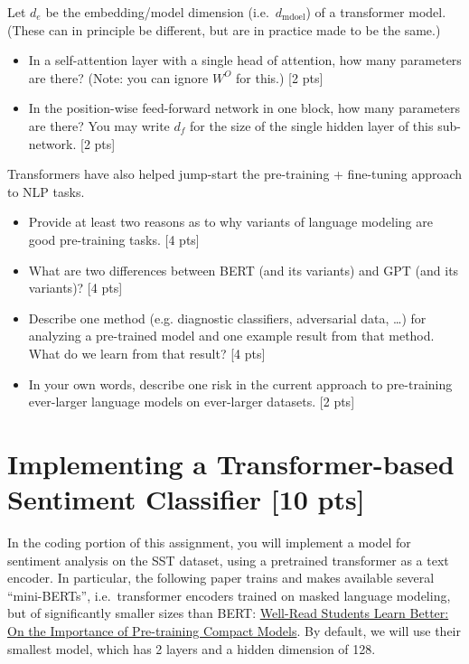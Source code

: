 \documentclass[11pt]{article}
\begin{document}
\vspace{2em}
 Let $d_e$ be the embedding/model dimension (i.e.\ $d_\text{mdoel}$) of a transformer model. (These can in principle be different, but are in practice made to be the same.)
\begin{itemize}
  \item In a self-attention layer with a single head of attention, how many parameters are there? (Note: you can ignore $W^O$ for this.) [2 pts]
  \item In the position-wise feed-forward network in one block, how many parameters are there? You may write $d_f$ for the size of the single hidden layer of this sub-network. [2 pts]
\end{itemize}

\vspace{2em}
 Transformers have also helped jump-start the pre-training + fine-tuning approach to NLP tasks.
\begin{itemize}
  \item Provide at least two reasons as to why variants of language modeling are good pre-training tasks. [4 pts]
  \item What are two differences between BERT (and its variants) and GPT (and its variants)? [4 pts]
  \item Describe one method (e.g. diagnostic classifiers, adversarial data, \dots) for analyzing a pre-trained model and one example result from that method.  What do we learn from that result? [4 pts]
  \item In your own words, describe one risk in the current approach to pre-training ever-larger language models on ever-larger datasets. [2 pts]
\end{itemize}


\section{Implementing a Transformer-based Sentiment Classifier [10 pts]}

In the coding portion of this assignment, you will implement a model for sentiment analysis on the SST dataset, using a pretrained transformer as a text encoder.  In particular, the following paper trains and makes available several ``mini-BERTs'', i.e.\ transformer encoders trained on masked language modeling, but of significantly smaller sizes than BERT: \href{https://arxiv.org/pdf/1908.08962.pdf}{Well-Read Students Learn Better: On the Importance of Pre-training Compact Models}.  By default, we will use their smallest model, which has 2 layers and a hidden dimension of 128.
\end{document}
